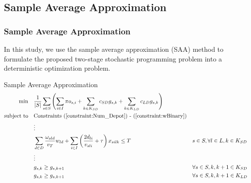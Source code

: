 \documentclass[aspectratio=169]{beamer}
\begin{document}
\subsection{Sample Average Approximation}
\begin{frame}
\frametitle{Sample Average Approximation}
In this study, we use the sample average approximation (SAA) method to formulate the proposed two-stage stochastic programming problem into a deterministic optimization problem.
\begin{alertblock}{Sample Average Approximation}
\vspace{-20pt}
\scriptsize
    \begin{subequations} \label{formulation:SAA}
        \begin{align}
            \min \quad & \frac{1}{|S|} \sum_{s \in S} \left(\sum_{i \in I} \pi o_{s,i} + \sum_{k \in K_{SD}} c_{SD} g_{s,k} + \sum_{k \in K_{LD}} c_{LD} g_{s,k} \right) && \label{objective:SAAObj} \\
            \operatorname{subject~to} \quad & \text{Constraints (\ref{constraint:Num_Depot}) - (\ref{constraint:wBinary})} && \label{constraint:1stStage_SAA}\\
                            & \vdots \\
                            & \sum_{d \in D} \frac{\omega_{sld}}{v_T} w_{ld} + \sum_{i \in I} \left( \frac{2d_{li}}{v_{sli}} + \tau \right) x_{silk} \leq T && s \in S , \forall l \in L, k \in K_{SD} \label{constraint:LPTimeLimitSD_SAA} \\
                            & \vdots \\
                            & g_{s,k} \geq g_{s,k+1} && \forall s \in S , k, k+1 \in K_{SD} \label{constraint:SD_Remove_Symmetry_SAA} \\
                            & g_{s,k} \geq g_{s,k+1} && \forall s \in S , k, k+1 \in K_{LD} \label{constraint:LD_Remove_Symmetry_SAA}
        \end{align}
    \end{subequations}    
\end{alertblock}
\end{frame}

\end{document}
